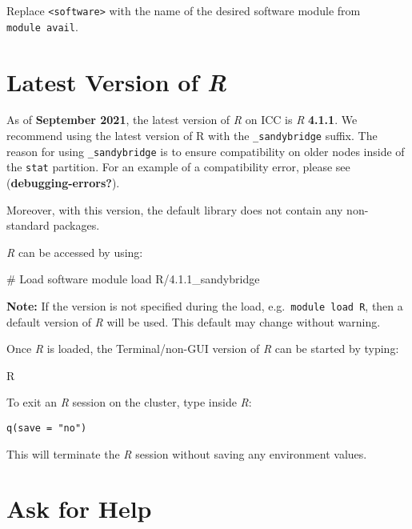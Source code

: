 \documentclass[
  letterpaper,
  DIV=11,
  numbers=noendperiod]{scrreport}
\newenvironment{Shaded}{\begin{snugshade}}{\end{snugshade}}
\newcommand{\CommentTok}[1]{\textcolor[rgb]{0.37,0.37,0.37}{#1}}
\newcommand{\ExtensionTok}[1]{\textcolor[rgb]{0.00,0.23,0.31}{#1}}
\newcommand{\NormalTok}[1]{\textcolor[rgb]{0.00,0.23,0.31}{#1}}
\begin{document}
Replace \texttt{\textless{}software\textgreater{}} with the name of the
desired software module from \texttt{module\ avail}.

\hypertarget{latest-version-of-r}{%
\section{\texorpdfstring{Latest Version of
\emph{R}}{Latest Version of R}}\label{latest-version-of-r}}

As of \textbf{September 2021}, the latest version of \emph{R} on ICC is
\emph{R} \textbf{4.1.1}. We recommend using the latest version of R with
the \texttt{\_sandybridge} suffix. The reason for using
\texttt{\_sandybridge} is to ensure compatibility on older nodes inside
of the \texttt{stat} partition. For an example of a compatibility error,
please see (\textbf{debugging-errors?}).

Moreover, with this version, the default library does not contain any
non-standard packages.

\emph{R} can be accessed by using:

\begin{Shaded}
\begin{Highlighting}[]
\CommentTok{\# Load software}
\ExtensionTok{module}\NormalTok{ load R/4.1.1\_sandybridge}
\end{Highlighting}
\end{Shaded}

\textbf{Note:} If the version is not specified during the load,
e.g.~\texttt{module\ load\ R}, then a default version of \emph{R} will
be used. This default may change without warning.

Once \emph{R} is loaded, the Terminal/non-GUI version of \emph{R} can be
started by typing:

\begin{Shaded}
\begin{Highlighting}[]
\ExtensionTok{R}
\end{Highlighting}
\end{Shaded}

To exit an \emph{R} session on the cluster, type inside \emph{R}:

\begin{verbatim}
q(save = "no")
\end{verbatim}

This will terminate the \emph{R} session without saving any environment
values.

\hypertarget{ask-for-help}{%
\section{Ask for Help}\label{ask-for-help}}
\end{document}
